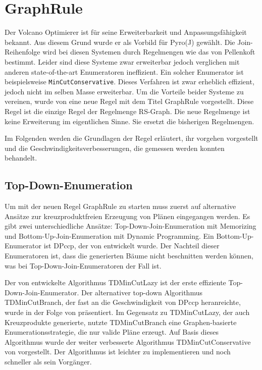 \section{GraphRule}


Der Volcano Optimierer ist für seine Erweiterbarkeit und Anpassungsfähigkeit bekannt. Aus diesem Grund wurde er als Vorbild für Pyro(J) gewählt. Die Join-Reihenfolge wird bei diesen Systemen durch Regelmengen wie das von Pellenkoft bestimmt. Leider sind diese Systeme zwar erweiterbar jedoch verglichen mit anderen state-of-the-art Enumeratoren ineffizient. Ein solcher Enumerator ist beispielsweise \texttt{MinCutConservative}. Dieses Verfahren ist zwar erheblich effizient, jedoch nicht im selben Masse erweiterbar. Um die Vorteile beider Systeme zu vereinen, wurde von \cite{shanbhag2014optimizing} eine neue Regel mit dem Titel GraphRule vorgestellt. Diese Regel ist die einzige Regel der Regelmenge RS-Graph. Die neue Regelmenge ist keine Erweiterung im eigentlichen Sinne. Sie ersetzt die bisherigen Regelmengen.

Im Folgenden werden die Grundlagen der Regel erläutert, ihr vorgehen vorgestellt und die Geschwindigkeitsverbesserungen, die gemessen werden konnten behandelt.

\subsection{Top-Down-Enumeration}

Um mit der neuen Regel GraphRule zu starten muss zuerst auf alternative Ansätze zur kreuzproduktfreien Erzeugung von Plänen eingegangen werden. Es gibt zwei unterschiedliche Ansätze: Top-Down-Join-Enumeration mit Memorizing und Bottom-Up-Join-Enumeration mit Dynamic Programming. Ein Bottom-Up-Enumerator ist DPccp, der von \cite{moerkotte2006analysis} entwickelt wurde. Der Nachteil dieser Enumeratoren ist, dass die generierten Bäume nicht beschnitten werden können, was bei Top-Down-Join-Enumeratoren der Fall ist.

Der von \cite{dehaan2007optimal} entwickelte Algorithmus TDMinCutLazy ist der erste effiziente Top-Down-Join-Enumerator. Der alternativer top-down Algorithmus TDMinCutBranch, der fast an die Geschwindigkeit von DPccp heranreichte, wurde in der Folge von \cite{fender2011new} präsentiert. Im Gegensatz zu TDMinCutLazy, der auch Kreuzprodukte generierte, nutzte TDMinCutBranch eine Graphen-basierte Enumerationsstrategie, die nur valide Pläne erzeugt.  Auf Basis dieses Algorithmus wurde der weiter verbesserte Algorithmus TDMinCutConservative von \cite{fender2012effective} vorgestellt. Der Algorithmus ist leichter zu implementieren und noch schneller als sein Vorgänger. 



